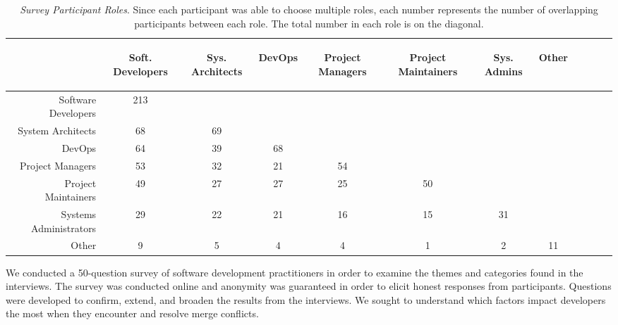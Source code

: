 \begin{table}[!]
\renewcommand{\arraystretch}{1.3}
\caption{\textit{Survey Participant Roles}. Since each participant was able to choose multiple roles, each number represents the number of overlapping participants between each role. The total number in each role is on the diagonal.}
\label{survey_roles}
\centering
\begin{tabularx}{0.45\textwidth}{@{}r|*{10}{C}c@{}}
\toprule
\addlinespace[5.4em]
	& \begin{rotate}{45} Soft. Developers \end{rotate} 
	& \begin{rotate}{45} Sys. Architects \end{rotate} 
	& \begin{rotate}{45} DevOps \end{rotate} 
	& \begin{rotate}{45} Project Managers \end{rotate}
	& \begin{rotate}{45} Project Maintainers \end{rotate}
	& \begin{rotate}{45} Sys. Admins \end{rotate}
	& \begin{rotate}{45} Other \end{rotate}\\
\midrule
	Software Developers & 213 & & & & & & \\
	System Architects & 68 & 69 & & & & & \\
	DevOps & 64 & 39 & 68 & & & & \\
	Project Managers & 53 & 32 & 21 & 54 & & & \\
	Project Maintainers & 49 & 27 & 27 & 25 & 50 & & \\
	Systems Administrators & 29 & 22 & 21 & 16 & 15 & 31 & \\
	Other & 9 & 5 & 4 & 4 & 1 & 2 & 11 \\
\bottomrule
\end{tabularx}
\end{table}

We conducted a 50-question survey of software development practitioners in order to examine the themes and categories found in the interviews.
The survey was conducted online and anonymity was guaranteed in order to elicit honest responses from participants.
Questions were developed to confirm, extend, and broaden the results from the interviews.
We sought to understand which factors impact developers the most when they encounter and resolve merge conflicts.

